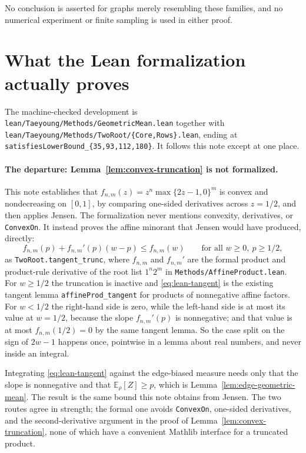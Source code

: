 \documentclass[11pt]{article}
\begin{document}
No conclusion is asserted for graphs merely resembling these families, and
no numerical experiment or finite sampling is used in either proof.


\section{What the Lean formalization actually proves}

The machine-checked development is
\texttt{lean/Taeyoung/Methods/GeometricMean.lean} together with
\texttt{lean/Taeyoung/Methods/TwoRoot/\{Core,Rows\}.lean}, ending at
\texttt{satisfiesLowerBound\_\{35,93,112,180\}}.  It follows this note except at
one place.

\paragraph{The departure: Lemma~\ref{lem:convex-truncation} is not formalized.}
This note establishes that $f_{n,m}(z)=z^n\max\{2z-1,0\}^m$ is convex and
nondecreasing on $[0,1]$, by comparing one-sided derivatives across $z=1/2$, and
then applies Jensen.  The formalization never mentions convexity, derivatives,
or \texttt{ConvexOn}.  It instead proves the affine minorant that Jensen would
have produced, directly:
\begin{equation}
 f_{n,m}(p)+f_{n,m}'(p)(w-p)\leq f_{n,m}(w)
 \qquad\text{for all }w\geq0,\ p\geq1/2,
 \label{eq:lean-tangent}
\end{equation}
as \texttt{TwoRoot.tangent\_trunc}, where $f_{n,m}$ and $f_{n,m}'$ are the
formal product and product-rule derivative of the root list $1^n2^m$ in
\texttt{Methods/AffineProduct.lean}.  For $w\geq1/2$ the truncation is inactive
and \eqref{eq:lean-tangent} is the existing tangent lemma
\texttt{affineProd\_tangent} for products of nonnegative affine factors.  For
$w<1/2$ the right-hand side is zero, while the left-hand side is at most its
value at $w=1/2$, because the slope $f_{n,m}'(p)$ is nonnegative; and that value
is at most $f_{n,m}(1/2)=0$ by the same tangent lemma.  So the case split on the
sign of $2w-1$ happens once, pointwise in a lemma about real numbers, and never
inside an integral.

Integrating \eqref{eq:lean-tangent} against the edge-biased measure needs only
that the slope is nonnegative and that $\mathbb{E}_\rho[Z]\geq p$, which is
Lemma~\ref{lem:edge-geometric-mean}.  The result is the same bound this note obtains
from Jensen.  The two routes agree in strength; the formal one avoids
\texttt{ConvexOn}, one-sided derivatives, and the second-derivative argument in
the proof of Lemma~\ref{lem:convex-truncation}, none of which have a convenient
Mathlib interface for a truncated product.
\end{document}
